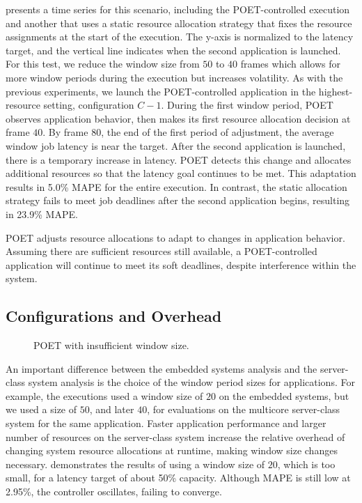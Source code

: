  presents a time series for this scenario, including the POET-controlled execution and another that uses a static resource allocation strategy that fixes the resource assignments at the start of the execution.
The y-axis is normalized to the latency target, and the vertical line indicates when the second application is launched.
For this test, we reduce the window size from $50$ to $40$ frames which allows for more window periods during the execution but increases volatility.
As with the previous experiments, we launch the POET-controlled  application in the highest-resource setting, configuration $C-1$.
During the first window period, POET observes application behavior, then makes its first resource allocation decision at frame $40$.
By frame $80$, the end of the first period of adjustment, the average window job latency is near the target.
After the second application is launched, there is a temporary increase in latency.
POET detects this change and allocates additional resources so that the latency goal continues to be met.
This adaptation results in 5.0\% MAPE for the entire execution.
In contrast, the static allocation strategy fails to meet job deadlines after the second application begins, resulting in 23.9\% MAPE.

POET adjusts resource allocations to adapt to changes in application behavior.
Assuming there are sufficient resources still available, a POET-controlled application will continue to meet its soft deadlines, despite interference within the system.


\subsection{Configurations and Overhead}
\label{sec:poet-server-eval-overhead}

\begin{figure}[t]
  \centering
      
  \caption{POET with insufficient window size.}
  \label{fig:poet-bodytrack-w20}
\end{figure}

An important difference between the embedded systems analysis and the server-class system analysis is the choice of the window period sizes for applications.
For example, the  executions used a window size of $20$ on the embedded systems, but we used a size of $50$, and later $40$, for evaluations on the multicore server-class system for the same application.
Faster application performance and larger number of resources on the server-class system increase the relative overhead of changing system resource allocations at runtime, making window size changes necessary.
 demonstrates the results of using a window size of $20$, which is too small, for a latency target of about 50\% capacity.
Although MAPE is still low at 2.95\%, the controller oscillates, failing to converge.

